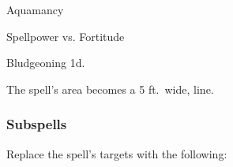 \newpage
\begin{spellsection}{Aquamancy}

\begin{spellheader}
\end{spellheader}

\begin{spellcontent}

\begin{spelltargetinginfo}




\end{spelltargetinginfo}


\begin{spelleffects}




\begin{spellattack}{Spellpower vs. Fortitude}


\hit Bludgeoning  \minus1d.


\end{spellattack}





\end{spelleffects}

\end{spellcontent}
\begin{spellfooter}


\end{spellfooter}
\begin{spellsubcontent}


\begin{spellcantrip}
The spell's area becomes a 5 ft.\ wide, \areamed line.
\end{spellcantrip}


\end{spellsubcontent}
\end{spellsection}


\subsubsection{Subspells}





Replace the spell's targets with the following:
\begin{spellcontent}

\begin{augmenttargetinginfo}




\end{augmenttargetinginfo}

\end{spellcontent}





